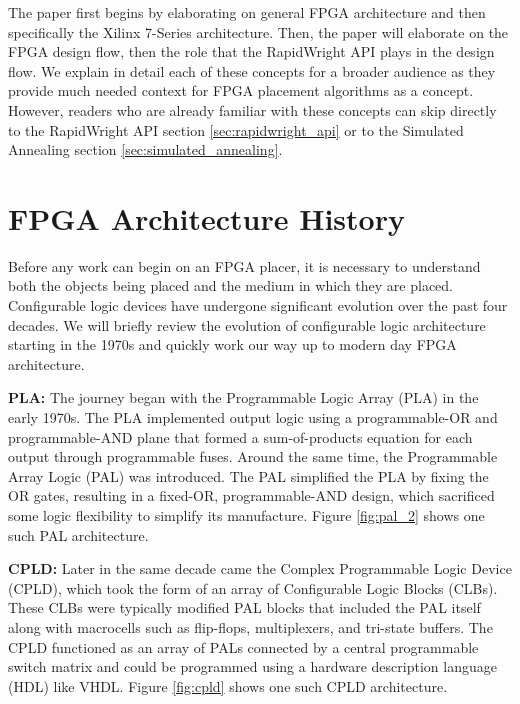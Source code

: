 \documentclass{article}
\begin{document}
\begin{multicols}{2}
    The paper first begins by elaborating on general FPGA architecture and then specifically the Xilinx 7-Series architecture. 
    Then, the paper will elaborate on the FPGA design flow, then the role that the RapidWright API plays in the design flow. 
    We explain in detail each of these concepts for a broader audience as they provide much needed context for FPGA placement algorithms as a concept. 
    However, readers who are already familiar with these concepts can skip directly to the RapidWright API section \ref{sec:rapidwright_api} or to the Simulated Annealing section \ref{sec:simulated_annealing}. 


\section{FPGA Architecture History}


    Before any work can begin on an FPGA placer, it is necessary to understand both the objects being placed and the medium in which they are placed.
    Configurable logic devices have undergone significant evolution over the past four decades. 
    We will briefly review the evolution of configurable logic architecture starting in the 1970s and quickly work our way up to modern day FPGA architecture. 
    
    \textbf{PLA:} \quad
    The journey began with the Programmable Logic Array (PLA) in the early 1970s. 
    The PLA implemented output logic using a programmable-OR and programmable-AND plane that formed a sum-of-products equation for each output through programmable fuses. 
    Around the same time, the Programmable Array Logic (PAL) was introduced. 
    The PAL simplified the PLA by fixing the OR gates, resulting in a fixed-OR, programmable-AND design, which sacrificed some logic flexibility to simplify its manufacture. 
    Figure \ref{fig:pal_2} shows one such PAL architecture. 

    \textbf{CPLD:} \quad 
    Later in the same decade came the Complex Programmable Logic Device (CPLD), which took the form of an array of Configurable Logic Blocks (CLBs). 
    These CLBs were typically modified PAL blocks that included the PAL itself along with macrocells such as flip-flops, multiplexers, and tri-state buffers. 
    The CPLD functioned as an array of PALs connected by a central programmable switch matrix and could be programmed using a hardware description language (HDL) like VHDL. 
    Figure \ref{fig:cpld} shows one such CPLD architecture. 
    \\


\end{multicols}
\end{document}
